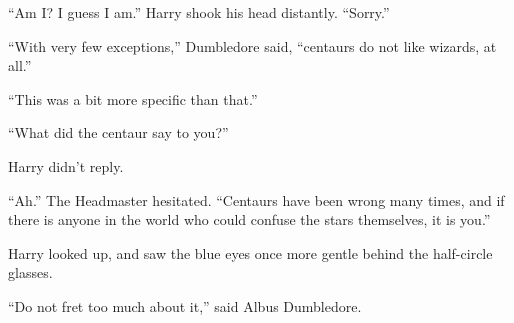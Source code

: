 ``Am I? I guess I am.'' Harry shook his head distantly. ``Sorry.''

``With very few exceptions,'' Dumbledore said, ``centaurs do not like wizards, at all.''

``This was a bit more specific than that.''

``What did the centaur say to you?''

Harry didn't reply.

``Ah.'' The Headmaster hesitated. ``Centaurs have been wrong many times, and if there is anyone in the world who could confuse the stars themselves, it is you.''

Harry looked up, and saw the blue eyes once more gentle behind the half-circle glasses.

``Do not fret too much about it,'' said Albus Dumbledore.
